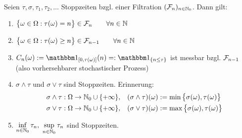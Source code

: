 \setcounter{section}{3}
\begin{proposition}\label{prop3.1}
	Seien $\tau,\sigma, \tau_1,\tau_2,\ldots$ Stoppzeiten bzgl. einer Filtration $(\mathcal{F}_n)_{n\in\mathbb{N}_0}$. Dann gilt:
	\begin{enumerate}[label=(\alph*)]
		\item $\begin{aligned}
			\big\lbrace\omega\in\Omega:\tau(\omega)=n\big\rbrace\in\mathcal{F}_n\qquad\forall n\in\mathbb{N}
		\end{aligned}$
		\item $\begin{aligned}
			\big\lbrace\omega\in\Omega:\tau(\omega)\geq n\big\rbrace\in\mathcal{F}_{n-1}\qquad\forall n\in\mathbb{N}
		\end{aligned}$
		\item $\begin{aligned}
			C_n(\omega):=\indi_{[0,\tau(\omega)]}(n)=:\indi_{\lbrace n\leq\tau\rbrace}
		\end{aligned}$ ist messbar bzgl. $\mathcal{F}_{n-1}$ (also vorhersehbarer stochastischer Prozess)
		\item $\sigma\wedge\tau$ und $\sigma\vee\tau$ sind Stoppzeiten. Erinnerung:
		\begin{align*}
			&\sigma\wedge\tau:\Omega\to\mathbb{N}_0\cup\lbrace+\infty\rbrace,&(\sigma\wedge\tau)(\omega)&:=\min\big\lbrace\sigma(\omega),\tau(\omega)\big\rbrace\\
			&\sigma\vee\tau:\Omega\to\mathbb{N}_0\cup\lbrace+\infty\rbrace,&(\sigma\vee\tau)(\omega)&:=\max\big\lbrace\sigma(\omega),\tau(\omega)\big\rbrace
		\end{align*}
		\item $\inf\limits_{n\in\mathbb{N}_0}\tau_n,~\sup\limits_{n\in\mathbb{N}_0}\tau_n$ sind Stoppzeiten.
	\end{enumerate}
\end{proposition}

